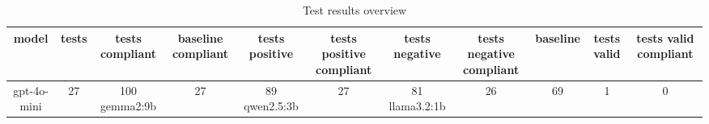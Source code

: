 
  \begin{table}[h!]
  \centering
  \begin{tabular}{|c|c|c|c|c|c|c|c|c|c|c|}
  \hline
  model & tests & tests compliant & baseline compliant & tests positive & tests positive compliant & tests negative & tests negative compliant & baseline & tests valid & tests valid compliant \\
  \hline
  gpt-4o-mini & 27 & 100%
\hline
gemma2:9b & 27 & 89%
\hline
qwen2.5:3b & 27 & 81%
\hline
llama3.2:1b & 26 & 69%
\hline
 & 1 & 0%
  \end{tabular}
  \caption{Test results overview}
  
  \end{table}
  